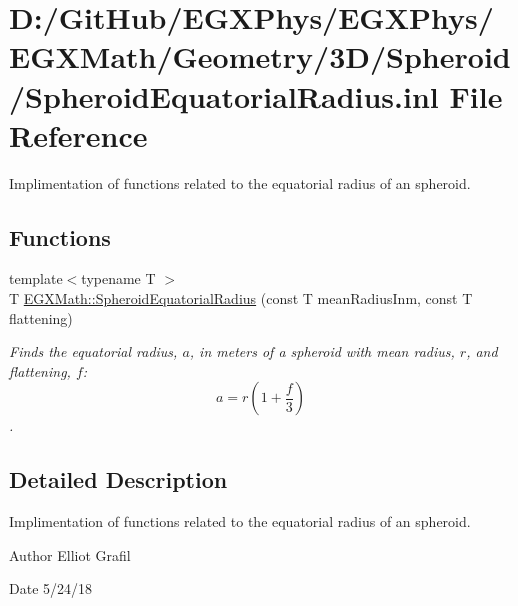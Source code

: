 \hypertarget{_spheroid_equatorial_radius_8inl}{}\section{D\+:/\+Git\+Hub/\+E\+G\+X\+Phys/\+E\+G\+X\+Phys/\+E\+G\+X\+Math/\+Geometry/3\+D/\+Spheroid/\+Spheroid\+Equatorial\+Radius.inl File Reference}
\label{_spheroid_equatorial_radius_8inl}


Implimentation of functions related to the equatorial radius of an spheroid.  


\subsection*{Functions}
\begin{DoxyCompactItemize}
\item 
{\footnotesize template$<$typename T $>$ }\\T \mbox{\hyperlink{group___e_g_x_math-_geometry-3_d-_spheroid-_equatorial_radius_ga1cbe564fee1b509c622d1c6d276158cd}{E\+G\+X\+Math\+::\+Spheroid\+Equatorial\+Radius}} (const T mean\+Radius\+Inm, const T flattening)
\begin{DoxyCompactList}\small\item\em Finds the equatorial radius, $a$, in meters of a spheroid with mean radius, $r$, and flattening, $f$\+: \[ a = r \left (1 + \dfrac{f}{3} \right ) \]. \end{DoxyCompactList}\end{DoxyCompactItemize}


\subsection{Detailed Description}
Implimentation of functions related to the equatorial radius of an spheroid. 

\begin{DoxyAuthor}{Author}
Elliot Grafil 
\end{DoxyAuthor}
\begin{DoxyDate}{Date}
5/24/18 
\end{DoxyDate}
